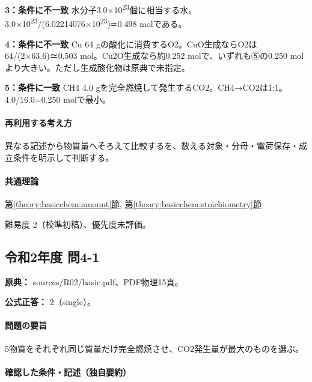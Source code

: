 \noindent\textbf{3：条件に不一致} 水分子3.0×10\textsuperscript{23}個に相当する水。3.0×10\textsuperscript{23}/(6.02214076×10\textsuperscript{23})≃0.498 molである。\par

\noindent\textbf{4：条件に不一致} Cu 64 gの酸化に消費するO2。CuO生成ならO2は64/(2×63.6)≃0.503 mol。Cu2O生成なら約0.252 molで、いずれも⑤の0.250 molより大きい。ただし生成酸化物は原典で未指定。\par

\noindent\textbf{5：条件に一致} CH4 4.0 gを完全燃焼して発生するCO2。CH4→CO2は1:1。4.0/16.0=\allowbreak{}0.250 molで最小。\par

\paragraph{再利用する考え方} 異なる記述から物質量へそろえて比較するを、数える対象・分母・電荷保存・成立条件を明示して判断する。

\paragraph{共通理論} \hyperref[theory:basicchem:amount]{第\ref*{theory:basicchem:amount}節}, \hyperref[theory:basicchem:stoichiometry]{第\ref*{theory:basicchem:stoichiometry}節}

\par 難易度 2（校準初稿）、優先度未評価。

\subsection{令和2年度 問4-1}
\label{q:r02-reg-basic-4-1}

\noindent\textbf{原典：} sources/R02/basic.pdf、PDF物理15頁。

\textbf{公式正答：} 2（single）。

\paragraph{問題の要旨} 5物質をそれぞれ同じ質量だけ完全燃焼させ、CO2発生量が最大のものを選ぶ。

\paragraph{確認した条件・記述（独自要約）}\mbox{}\par

